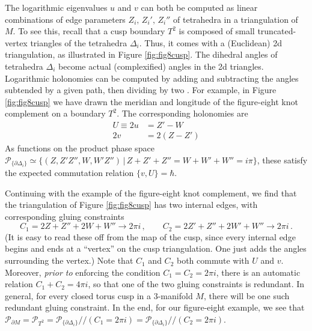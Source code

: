 \documentclass[hyper,letterpaper]{JHEP3}
\numberwithin{equation}{section}
\newcommand{\be}{\begin{equation}}
\newcommand{\ee}{\end{equation}}
\newcommand{\pd}{\partial}
\newcommand{\CP}{\mathcal{P}}
\begin{document}
The logarithmic eigenvalues $u$ and $v$ can both be computed as linear combinations of edge parameters $Z_i,\,Z_i',\,Z_i''$ of tetrahedra in a triangulation of $M$. To see this, recall that a cusp boundary $T^2$ is composed of small truncated-vertex triangles of the tetrahedra $\Delta_i$. Thus, it comes with a (Euclidean) 2d triangulation, as illustrated in Figure \ref{fig:fig8cusp}. The dihedral angles of tetrahedra $\Delta_i$ become actual (complexified) angles in the 2d triangles. Logarithmic holonomies can be computed by adding and subtracting the angles subtended by a given path, then dividing by two \cite{NZ, Neumann-combinatorics}. For example, in Figure \ref{fig:fig8cusp} we have drawn the meridian and longitude of the figure-eight knot complement on a boundary $T^2$. The corresponding holonomies are
%
\begin{subequations} \label{Uv41}
\begin{align} U\equiv 2u &= Z'-W \\
 2v &= 2(Z-Z')
\end{align}
\end{subequations}
%
As functions on the product phase space $\CP_{\{\pd\Delta_i\}}\simeq \{(Z,Z'Z'',W,W'Z'')\,|\,Z+Z'+Z''=W+W'+W''=i\pi\}$, these satisfy the expected commutation relation $\{v,U\}=\hbar$.






Continuing with the example of the figure-eight knot complement, we find that the triangulation of Figure \ref{fig:fig8cusp} has two internal edges, with corresponding gluing constraints
%
\be \label{C41}
C_1 = 2Z+Z''+2W+W'' \to 2\pi i\,,\qquad C_2 = 2Z'+Z''+2W'+W'' \to 2\pi i\,. \ee
%
(It is easy to read these off from the map of the cusp, since every internal edge begins and ends at a ``vertex'' on the cusp triangulation. One just adds the angles surrounding the vertex.) Note that $C_1$ and $C_2$ both commute with $U$ and $v$. Moreover, \emph{prior to} enforcing the condition $C_1=C_2=2\pi i$, there is an automatic relation $C_1+C_2=4\pi i$, so that one of the two gluing constraints is redundant. In general, for every closed torus cusp in a 3-manifold $M$, there will be one such redundant gluing constraint. In the end, for our figure-eight example, we see that $\CP_{\pd M}=\CP_{T^2} = \CP_{\{\pd\Delta_i\}}\big/\!\!\big/(C_1=2\pi i) = \CP_{\{\pd\Delta_i\}}\big/\!\!\big/(C_2=2\pi i)$.
\end{document}
